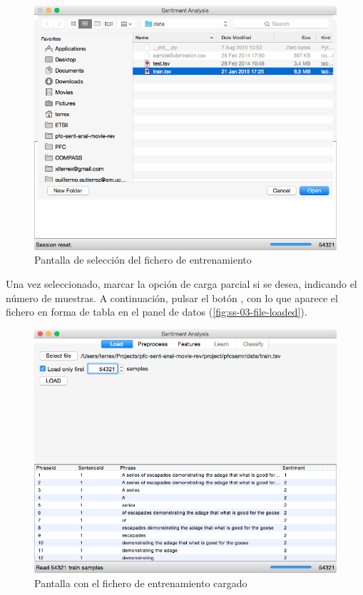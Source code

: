 \begin{figure}[H]
\centering
\includegraphics[width=14cm]{ss-02-load-file}
\caption{Pantalla de selección del fichero de entrenamiento}
\label{fig:ss-02-load-file}
\end{figure}

\newpage
Una vez seleccionado, marcar la opción de carga parcial si se desea, indicando el número de muestras. A continuación, pulsar el botón , con lo que aparece el fichero en forma de tabla en el panel de datos (\autoref{fig:ss-03-file-loaded}).

\begin{figure}[H]
\centering
\includegraphics[width=14cm]{ss-03-file-loaded}
\caption{Pantalla con el fichero de entrenamiento cargado}
\label{fig:ss-03-file-loaded}
\end{figure}

